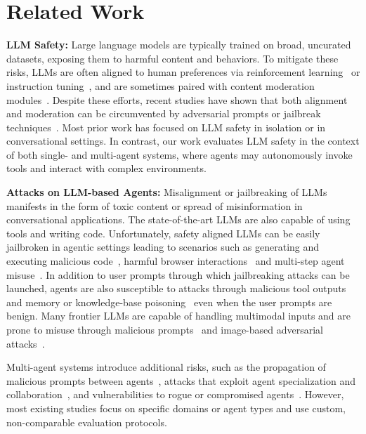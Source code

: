 \vspace{-0.2in}
\section{Related Work}
\vspace{-0.05in}

\textbf{LLM Safety:} Large language models are typically trained on broad, uncurated datasets, exposing them to harmful content and behaviors. To mitigate these risks, LLMs are often aligned to human preferences via reinforcement learning~\citep{christiano2017deep,bai2022training} or instruction tuning~\citep{ouyang2022training}, and are sometimes paired with content moderation modules~\citep{inan2023llama,zeng2024shieldgemma,han2024wildguard}. Despite these efforts, recent studies have shown that both alignment and moderation can be circumvented by adversarial prompts or jailbreak techniques~\citep{carlini2023aligned,chao2024jailbreakbench,wei2023jailbroken,zou2023universal,liu2023autodan,liu2024calibration}. Most prior work has focused on LLM safety in isolation or in conversational settings. In contrast, our work evaluates LLM safety in the context of both single- and multi-agent systems, where agents may autonomously invoke tools and interact with complex environments.
    
    \textbf{Attacks on LLM-based Agents:}
    Misalignment or jailbreaking of LLMs manifests in the form of toxic content or spread of misinformation in conversational applications. The state-of-the-art LLMs are also capable of using tools and writing code. Unfortunately, safety aligned LLMs can be easily jailbroken in agentic settings leading to scenarios such as generating and executing malicious code~\citep{guo2024redcode}, harmful browser interactions~\cite{kumar2024refusal,tur2025safearena} and multi-step agent misuse~\citep{andriushchenko2024agentharm}. In addition to user prompts through which jailbreaking attacks can be launched, agents are also susceptible to attacks through malicious tool outputs~\citep{debenedetti2024agentdojo,zhang2024agent,zhan2024injecagent,ruan2023identifying} and memory or knowledge-base poisoning~\citep{zhang2024agent,chen2024agentpoison} even when the user prompts are benign. Many frontier LLMs are capable of handling multimodal inputs and are prone to misuse through malicious prompts~\citep{tur2025safearena} and image-based adversarial attacks~\citep{aichberger2025attacking,wudissecting}.
    
    Multi-agent systems introduce additional risks, such as the propagation of malicious prompts between agents~\citep{lee2024prompt}, attacks that exploit agent specialization and collaboration~\citep{tian2023evil,amayuelas2024multiagent}, and vulnerabilities to rogue or compromised agents~\citep{barbi2025preventing}. However, most existing studies focus on specific domains or agent types and use custom, non-comparable evaluation protocols.
    
